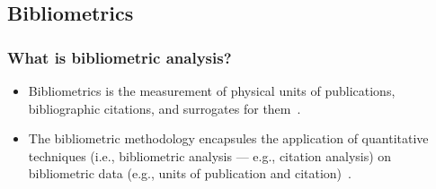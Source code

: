 \documentclass[aspectratio=169]{beamer}
\begin{document}
\subsection{Bibliometrics}

\begin{frame}
	\frametitle{What is bibliometric analysis?}
	\begin{itemize}
		\item Bibliometrics is the measurement of physical units of 
            publications, bibliographic citations, and surrogates for 
            them~\cite{broadus1987}.
		\item The bibliometric methodology encapsules the application of
		      quantitative techniques (i.e., bibliometric analysis --- e.g.,
              citation analysis) on bibliometric data (e.g., units of 
              publication and citation)~\cite{donthu2021}.
	\end{itemize}
\end{frame}
\end{document}
